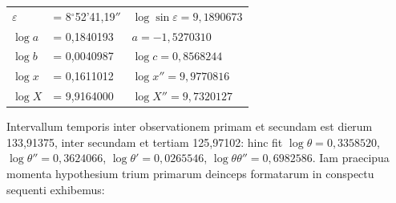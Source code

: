 \documentclass[12pt,a4paper]{article}
\begin{document}
\begin{center}
\begin{tabular}{lll}
\toprule
$\varepsilon$ & = 8$^\circ$52'41,19$''$ & $\log\sin\varepsilon = 9,1890673$\\
$\log a$ & = 0,1840193 & $a = -1,5270310$\\
$\log b$ & = 0,0040987 & $\log c = 0,8568244$\\
$\log x$ & = 0,1611012 & $\log x'' = 9,9770816$\\
$\log X$ & = 9,9164000 & $\log X'' = 9,7320127$\\
\bottomrule
\end{tabular}
\end{center}


Intervallum temporis inter observationem primam et secundam est dierum 133,91375, inter secundam et tertiam 125,97102: hinc fit $\log\theta = 0,3358520$, $\log\theta'' = 0,3624066$, $\log\theta' = 0,0265546$, $\log\theta\theta'' = 0,6982586$. Iam praecipua momenta hypothesium trium primarum deinceps formatarum in conspectu sequenti exhibemus:
\end{document}
